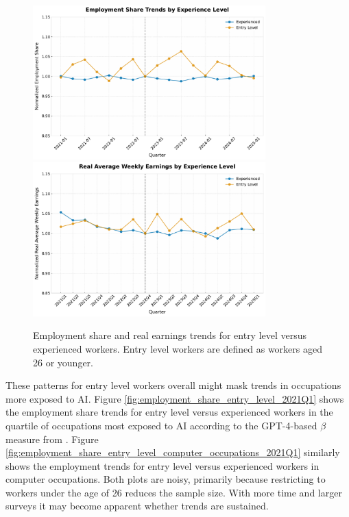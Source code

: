 \documentclass[12pt]{article}
\numberwithin{equation}{section}
\theoremstyle{theorem}\newcustomtheorem{theorem}{{\bf\sc Theorem}}
\theoremstyle{definition}\newcustomtheorem{assumption}{{\bf\sc Assumption}}
\theoremstyle{theorem} \newcustomtheorem{proposition}{{\bf\sc Proposition}}
\begin{document}
\begin{figure}[htbp]
	\centering
  \includegraphics[width=0.8\textwidth]{../figures/employment_share_entry_level_overall.pdf}
  \includegraphics[width=0.8\textwidth]{../figures/real_earnings_by_entry_level.pdf}
	\caption{Employment share and real earnings trends for entry level versus experienced workers. Entry level workers are defined as workers aged 26 or younger. }
	\label{fig:employment_share_entry_level_overall}
\end{figure}

These patterns for entry level workers overall might mask trends in occupations more exposed to AI. Figure \ref{fig:employment_share_entry_level_2021Q1} shows the employment share trends for entry level versus experienced workers in the quartile of occupations most exposed to AI according to the GPT-4-based $\beta$ measure from \citet{eloundou_gpts_2024}. Figure \ref{fig:employment_share_entry_level_computer_occupations_2021Q1} similarly shows the employment trends for entry level versus experienced workers in computer occupations. Both plots are noisy, primarily because restricting to workers under the age of 26 reduces the sample size. With more time and larger surveys it may become apparent whether trends are sustained. 
\end{document}

